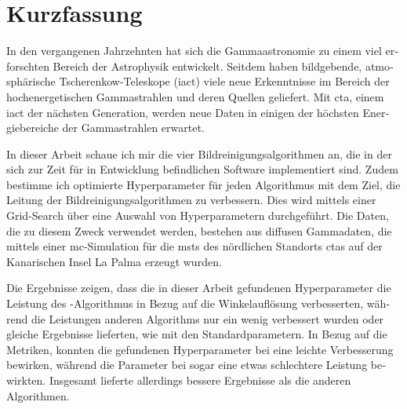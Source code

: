 \section*{Kurzfassung}
\begin{otherlanguage}{ngerman}
In den vergangenen Jahrzehnten hat sich die Gammaastronomie zu einem viel erforschten Bereich der
Astrophysik entwickelt. Seitdem haben bildgebende, atmosphärische Tscherenkow-Teleskope (\gls{iact})
viele neue Erkenntnisse im Bereich der hochenergetischen Gammastrahlen und deren Quellen geliefert.
Mit \gls{cta}, einem \gls{iact} der nächsten Generation, werden neue Daten in einigen der höchsten
Energiebereiche der Gammastrahlen erwartet.

In dieser Arbeit schaue ich mir die vier Bildreinigungsalgorithmen an, die in der sich zur Zeit für \cta{}
in Entwicklung befindlichen Software \ctapipe{} implementiert sind. Zudem bestimme ich optimierte
Hyperparameter für jeden Algorithmus mit dem Ziel, die Leitung der Bildreinigungsalgorithmen zu verbessern.
Dies wird mittels einer Grid-Search über eine Auswahl von Hyperparametern durchgeführt. Die Daten, die zu diesem
Zweck verwendet werden, bestehen aus diffusen Gammadaten, die mittels einer \gls{mc}-Simulation für die
\glspl{mst} des nördlichen Standorts \gls{cta}s auf der Kanarischen Insel La Palma erzeugt wurden.

Die Ergebnisse zeigen, dass die in dieser Arbeit gefundenen Hyperparameter die Leistung des \tcc{}-Algorithmus
in Bezug auf die Winkelauflösung verbesserten, während die Leistungen anderen Algorithms nur ein wenig
verbessert wurden oder gleiche Ergebnisse lieferten, wie mit den Standardparametern.
In Bezug auf die Metriken, konnten die gefundenen Hyperparameter bei \tcc{} eine leichte Verbesserung
bewirken, während die Parameter bei \fact{} sogar eine etwas schlechtere Leistung bewirkten.
Insgesamt lieferte \fact{} allerdings bessere Ergebnisse als die anderen Algorithmen.
\end{otherlanguage}
\glsresetall
\listoftodos
